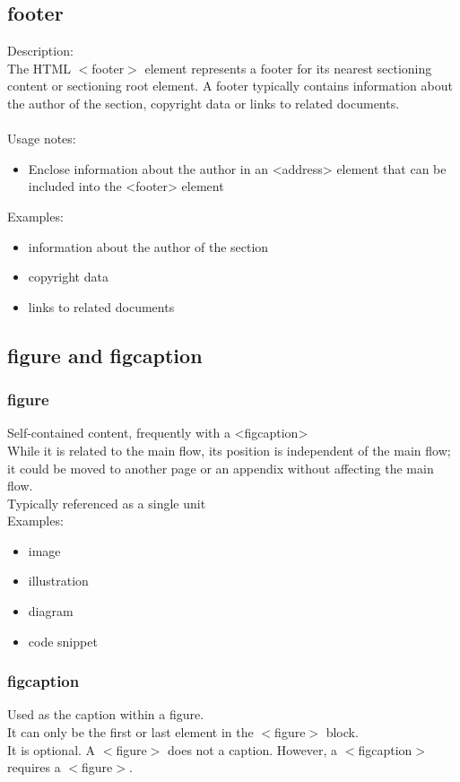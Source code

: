 \documentclass[]{article}
\newcommand{\<}{\guilsinglleft}
\renewcommand{\>}{\guilsinglright}
\begin{document}
\subsection{footer}
Description:
\\
The HTML $<$footer$>$ element represents a footer for its nearest sectioning content or sectioning root element. A footer typically contains information about the author of the section, copyright data or links to related documents.
\\\\
Usage notes:
\begin{itemize}
	\item Enclose information about the author in an <address> element that can be included into the <footer> element 
\end{itemize}
Examples:
\begin{itemize}
	\item information about the author of the section
	\item copyright data
	\item links to related documents
\end{itemize}

\subsection{figure and figcaption}
\subsubsection{figure}
Self-contained content, frequently with a <figcaption>
\\
While it is related to the main flow, its position is independent of the main flow; it could be moved to another page or an appendix without affecting the main flow. 
\\
Typically referenced as a single unit
\\
Examples:
\begin{itemize}
	\item image
	\item illustration
	\item diagram
	\item code snippet
\end{itemize}
\subsubsection{figcaption}
Used as the caption within a figure.
\\
It can only be the first or last element in the $<$figure$>$ block.
\\
It is optional.  A $<$figure$>$ does not a caption.  However, a $<$figcaption$>$ requires a $<$figure$>$.
\end{document}
